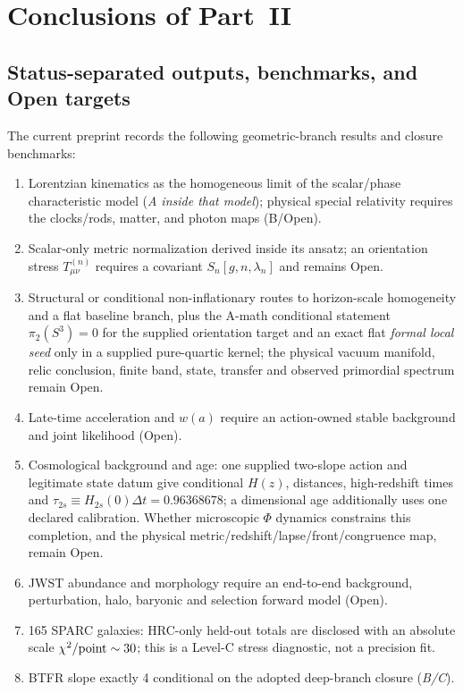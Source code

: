 \documentclass[11pt,a4paper]{article}
\begin{document}
\section{Conclusions of Part~II}

\subsection{Status-separated outputs, benchmarks, and Open targets}

The current preprint records the following geometric-branch results and closure benchmarks:

\begin{enumerate}
\item Lorentzian kinematics as the homogeneous limit of the scalar/phase characteristic model (\emph{A inside that model}); physical special relativity requires the clocks/rods, matter, and photon maps (B/Open).
\item Scalar-only metric normalization derived inside its ansatz; an orientation stress $T^{(n)}_{\mu\nu}$ requires a covariant $S_n[g,n,\lambda_n]$ and remains Open.
\item Structural or conditional non-inflationary routes to horizon-scale
homogeneity and a flat baseline branch, plus the A-math conditional statement
$\pi_2(S^3)=0$ for the supplied orientation target and an
exact flat \emph{formal local seed} only in a supplied pure-quartic kernel;
the physical vacuum manifold, relic conclusion, finite band, state, transfer
and observed primordial spectrum remain Open.
\item Late-time acceleration and $w(a)$ require an action-owned stable background and joint likelihood (Open).
\item Cosmological background and age: one supplied two-slope action and legitimate state datum give conditional $H(z)$, distances, high-redshift times and $\tau_{2s}\equiv H_{2s}(0)\Delta t=0.96368678$; a dimensional age additionally uses one declared calibration. Whether microscopic $\Phi$ dynamics constrains this completion, and the physical metric/redshift/lapse/front/congruence map, remain Open.
\item JWST abundance and morphology require an end-to-end background, perturbation, halo, baryonic and selection forward model (Open).
\item 165 SPARC galaxies: HRC-only held-out totals are disclosed with an absolute scale $\chi^2/{\rm point}\sim30$; this is a Level-C stress diagnostic, not a precision fit.
\item BTFR slope exactly 4 conditional on the adopted deep-branch closure (\emph{B/C}).

\end{enumerate}
\end{document}

